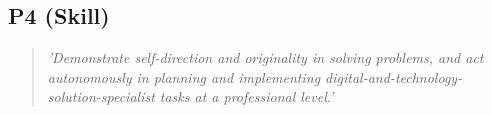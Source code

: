 \subsection{P4 (Skill)}

  \begin{quote}
    \textit{'Demonstrate self-direction and originality in
    solving problems, and act autonomously in planning and
    implementing digital-and-technology-solution-specialist
    tasks at a professional level.'}
  \end{quote}

\newpage
